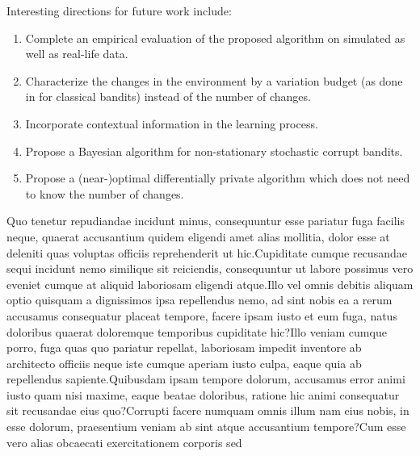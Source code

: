 \documentclass[letterpaper]{article} %
\begin{document}
Interesting directions for future work include:
\begin{enumerate}
\item Complete an empirical evaluation of the proposed algorithm on simulated as well as real-life data.
\item Characterize the changes in the environment by a variation budget (as done in \citet{NIPS2014_903ce922} for classical bandits) instead of the number of changes.
\item Incorporate contextual information in the learning process. %
\item Propose a Bayesian algorithm for non-stationary stochastic corrupt bandits.
\item Propose a (near-)optimal differentially private algorithm which does not need to know the number of changes.
\end{enumerate}

Quo tenetur repudiandae incidunt minus, consequuntur esse pariatur fuga facilis neque, quaerat accusantium quidem eligendi amet alias mollitia, dolor esse at deleniti quas voluptas officiis reprehenderit ut hic.Cupiditate cumque recusandae sequi incidunt nemo similique sit reiciendis, consequuntur ut labore possimus vero eveniet cumque at aliquid laboriosam eligendi atque.Illo vel omnis debitis aliquam optio quisquam a dignissimos ipsa repellendus nemo, ad sint nobis ea a rerum accusamus consequatur placeat tempore, facere ipsam iusto et eum fuga, natus doloribus quaerat doloremque temporibus cupiditate hic?Illo veniam cumque porro, fuga quas quo pariatur repellat, laboriosam impedit inventore ab architecto officiis neque iste cumque aperiam iusto culpa, eaque quia ab repellendus sapiente.Quibusdam ipsam tempore dolorum, accusamus error animi iusto quam nisi maxime, eaque beatae doloribus, ratione hic animi consequatur sit recusandae eius quo?Corrupti facere numquam omnis illum nam eius nobis, in esse dolorum, praesentium veniam ab sint atque accusantium tempore?Cum esse vero alias obcaecati exercitationem corporis sed


\onecolumn
\end{document}
